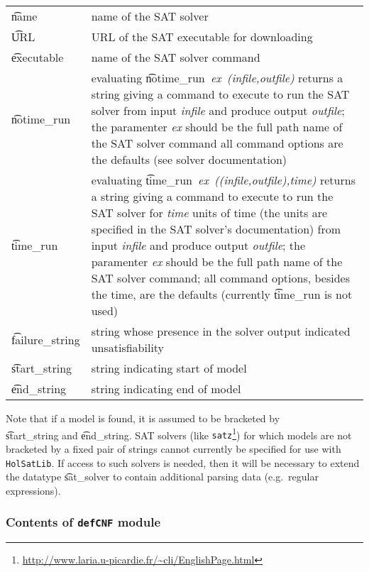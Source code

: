 \begin{tabular}{lp{4.75in}}
\t{name} & name of the SAT solver \\

\t{URL} & URL of the SAT executable for downloading\\

\t{executable} &
name of the SAT solver command\\

\t{notime\_run} &
evaluating \t{notime\_run}{\it~ex~(infile,outfile)} returns a string giving a command to execute to run the SAT solver from input {\it infile} and produce output {\it outfile}; the paramenter {\it ex} should be the full path name of the  SAT solver command all command options are the defaults (see solver documentation)\\

\t{time\_run} &
evaluating \t{time\_run}{\it~ex~((infile,outfile),time)} returns a string giving a command to execute to run the SAT solver for {\it time} units of time (the units are specified in the SAT solver's documentation) from input {\it infile} and produce output {\it outfile}; the paramenter {\it ex} should be the full path name of the  SAT solver command; all command options, besides the time, are the defaults (currently \t{time\_run} is not used)\\

\t{failure\_string} & string whose presence in the solver output indicated unsatisfiability\\


\t{start\_string} &
string indicating start of model \\


\t{end\_string} &
string indicating end of model \\

\end{tabular}

\medskip

Note that if a model is found, it is assumed to be bracketed
by \\ \t{start\_string} and \t{end\_string}. SAT solvers 
(like {\tt satz}\footnote{\url{http://www.laria.u-picardie.fr/~cli/EnglishPage.html}})
for which models are not bracketed by a fixed pair of strings cannot currently
be specified for use with {\tt HolSatLib}. If access to such solvers is needed, then
it will be necessary to extend the datatype \t{sat\_solver} to contain
additional parsing data (e.g.~regular expressions).

\subsubsection{Contents of {\tt defCNF} module}


